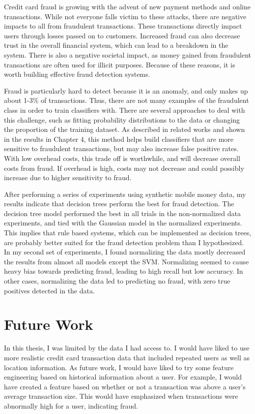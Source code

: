 \documentclass[midd]{thesis}
\begin{document}
Credit card fraud is growing with the advent of new payment methods and online transactions. While not everyone falls victim to these attacks, there are negative impacts to all from fraudulent transactions. These transactions directly impact users through losses passed on to customers. Increased fraud can also decrease trust in the overall financial system, which can lead to a breakdown in the system. There is also a negative societal impact, as money gained from fraudulent transactions are often used for illicit purposes. Because of these reasons, it is worth building effective fraud detection systems.

Fraud is particularly hard to detect because it is an anomaly, and only makes up about 1-3\% of transactions. Thus, there are not many examples of the fraudulent class in order to train classifiers with. There are several approaches to deal with this challenge, such as fitting probability distributions to the data or changing the proportion of the training dataset. As described in related works and shown in the results in Chapter 4, this method helps build classifiers that are more sensitive to fraudulent transactions, but may also increase false positive rates.  With low overhead costs, this trade off is worthwhile, and will decrease overall costs from fraud. If overhead is high, costs may not decrease and could possibly increase due to higher sensitivity to fraud. 

After performing a series of experiments using synthetic mobile money data, my results indicate that decision trees perform the best for fraud detection. The decision tree model performed the best in all trials in the non-normalized data experiments, and tied with the Gaussian model in the normalized experiments. This implies that rule based systems, which can be implemented as decision trees, are probably better suited for the fraud detection problem than I hypothesized. In my second set of experiments, I found normalizing the data mostly decreased the results from almost all models except the SVM. Normalizing seemed to cause heavy bias towards predicting fraud, leading to high recall but low accuracy. In other cases, normalizing the data led to predicting no fraud, with zero true positives detected in the data. 

\section{Future Work}

In this thesis, I was limited by the data I had access to. I would have liked to use more realistic credit card transaction data that included repeated users as well as location information. As future work, I would have liked to try some feature engineering based on historical information about a user. For example, I would have created a feature based on whether or not a transaction was above a user's average transaction size. This would have emphasized when transactions were abnormally high for a user, indicating fraud. 
\end{document}
